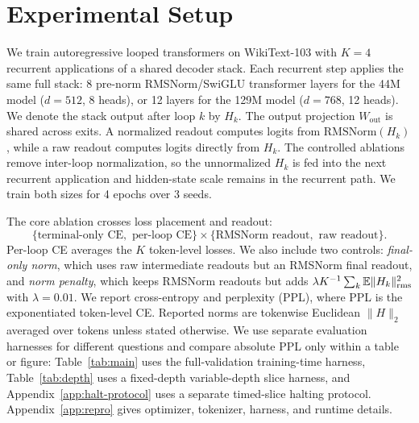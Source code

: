 \section{Experimental Setup}
\label{sec:setup}

We train autoregressive looped transformers on WikiText-103 \citep{merity2017pointer} with $K=4$ recurrent applications of a shared decoder stack.
Each recurrent step applies the same full stack: 8 pre-norm RMSNorm/SwiGLU transformer layers for the 44M model ($d=512$, 8 heads), or 12 layers for the 129M model ($d=768$, 12 heads).
We denote the stack output after loop $k$ by $H_k$.
The output projection $W_{\mathrm{out}}$ is shared across exits.
A normalized readout computes logits from $\mathrm{RMSNorm}(H_k)$, while a raw readout computes logits directly from $H_k$.
The controlled ablations remove inter-loop normalization, so the unnormalized $H_k$ is fed into the next recurrent application and hidden-state scale remains in the recurrent path.
We train both sizes for 4 epochs over 3 seeds.

The core ablation crosses loss placement and readout:
\begin{equation}
    \{\text{terminal-only CE},\text{ per-loop CE}\}\times
    \{\text{RMSNorm readout},\text{ raw readout}\}.
\end{equation}
Per-loop CE averages the $K$ token-level losses.
We also include two controls: \emph{final-only norm}, which uses raw intermediate readouts but an RMSNorm final readout, and \emph{norm penalty}, which keeps RMSNorm readouts but adds
$\lambda K^{-1}\sum_k \mathbb{E}\|H_k\|_{\mathrm{rms}}^2$ with $\lambda=0.01$.
We report cross-entropy and perplexity (PPL), where PPL is the exponentiated token-level CE.
Reported norms are tokenwise Euclidean $\|H\|_2$ averaged over tokens unless stated otherwise.
We use separate evaluation harnesses for different questions and compare absolute PPL only within a table or figure: Table~\ref{tab:main} uses the full-validation training-time harness, Table~\ref{tab:depth} uses a fixed-depth variable-depth slice harness, and Appendix~\ref{app:halt-protocol} uses a separate timed-slice halting protocol.
Appendix~\ref{app:repro} gives optimizer, tokenizer, harness, and runtime details.
